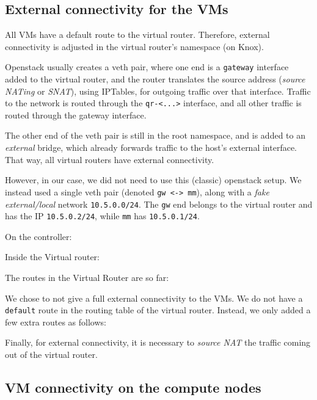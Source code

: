 \subsection{External connectivity for the VMs}
\label{section:external:connectivity}

All VMs have a default route to the virtual router. Therefore,
external connectivity is adjusted in the virtual router's namespace
(on Knox).

Openstack usually creates a veth pair, where one end is a
\texttt{gateway} interface added to the virtual router, and the router
translates the source address (\emph{source NATing} or \emph{SNAT}),
using IPTables, for outgoing traffic over that interface. Traffic to
the  network is routed through the
\texttt{qr-\textless{}...\textgreater{}} interface, and all other
traffic is routed through the gateway interface.

The other end of the veth pair is still in the root namespace, and is
added to an \emph{external} bridge, which already forwards traffic to
the host's external interface. That way, all virtual routers have
external connectivity.

However, in our case, we did not need to use this (classic) openstack
setup. We instead used a single veth pair (denoted \texttt{gw\
  \textless{}-\textgreater{}\ mm}), along with a \emph{fake
  external/local} network \texttt{10.5.0.0/24}. The \texttt{gw} end
belongs to the virtual router and has the IP \texttt{10.5.0.2/24},
while \texttt{mm} has \texttt{10.5.0.1/24}.

On the controller:


Inside the Virtual router:


The routes in the Virtual Router are so far:


We chose to not give a full external connectivity to the VMs. We do
not have a \texttt{default} route in the routing table of the virtual
router. Instead, we only added a few extra routes as follows:


Finally, for external connectivity, it is necessary to \emph{source
  NAT} the traffic coming out of the virtual router.


\subsection{VM connectivity on the compute nodes}
\label{section:connectivity:compute:nodes}

